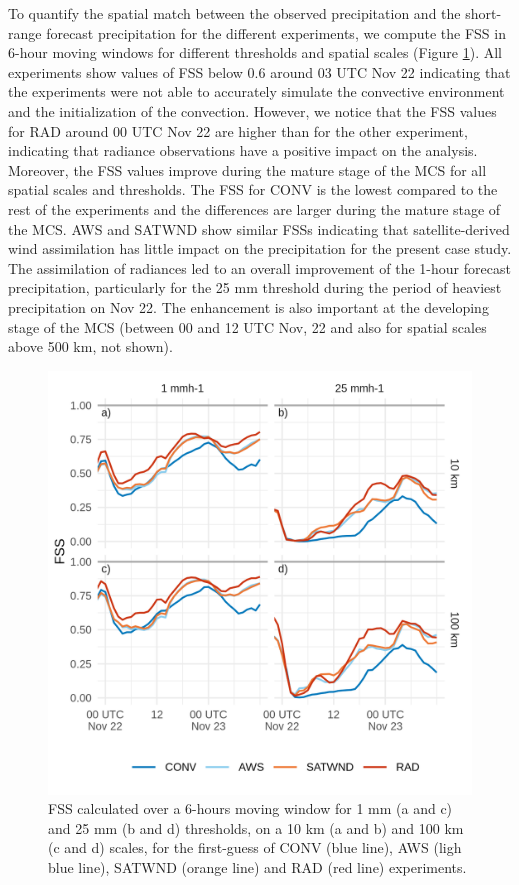 \documentclass[final,5p,times,twocolumn,authoryear]{elsarticle} %
\begin{document}
To quantify the spatial match between the observed precipitation and the short-range forecast precipitation for the different experiments, we compute the FSS in 6-hour moving windows for different thresholds and spatial scales (Figure \ref{fig:fss}). All experiments show values of FSS below 0.6 around 03 UTC Nov 22 indicating that the experiments were not able to accurately simulate the convective environment and the initialization of the convection. However, we notice that the FSS values for RAD around 00 UTC Nov 22 are higher than for the other experiment, indicating that radiance observations have a positive impact on the analysis. Moreover, the FSS values improve during the mature stage of the MCS for all spatial scales and thresholds. The FSS for CONV is the lowest compared to the rest of the experiments and the differences are larger during the mature stage of the MCS. AWS and SATWND show similar FSSs indicating that satellite-derived wind assimilation has little impact on the precipitation for the present case study. The assimilation of radiances led to an overall improvement of the 1-hour forecast precipitation, particularly for the 25 mm threshold during the period of heaviest precipitation on Nov 22. The enhancement is also important at the developing stage of the MCS (between 00 and 12 UTC Nov, 22 and also for spatial scales above 500 km, not shown).



\begin{figure}
\centering
\includegraphics{../figures/fss-1.png}
\caption{\label{fig:fss}FSS calculated over a 6-hours moving window for 1 mm (a and c) and 25 mm (b and d) thresholds, on a 10 km (a and b) and 100 km (c and d) scales, for the first-guess of CONV (blue line), AWS (ligh blue line), SATWND (orange line) and RAD (red line) experiments.}
\end{figure}
\end{document}
